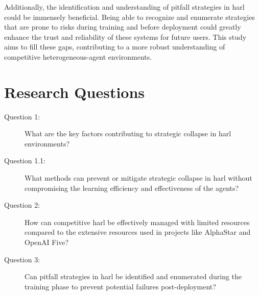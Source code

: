 Additionally, the identification and understanding of pitfall strategies in \gls{harl} 
could be immensely beneficial. Being able to recognize and enumerate strategies that are prone 
to risks during training and before deployment could greatly enhance the trust and 
reliability of these systems for future users. This study aims to fill these gaps, 
contributing to a more robust understanding of competitive heterogeneous-agent environments.


\section{Research Questions}%
\label{sec:research_question}%
\label{sec:relevance_and_importance}

\begin{description}
    \item[Question 1:] 
    What are the key factors contributing to strategic collapse in \gls{harl} environments?
    \item[Question 1.1:] 
    What methods can prevent or mitigate strategic collapse in \gls{harl} without compromising the 
    learning efficiency and effectiveness of the agents?
    \item[Question 2:] 
    How can competitive \gls{harl} be effectively managed with limited resources compared to the 
    extensive resources used in projects like AlphaStar and OpenAI Five?
    \item[Question 3:] 
    Can pitfall strategies in \gls{harl} be identified and enumerated during the training phase to 
    prevent potential failures post-deployment?
\end{description}

